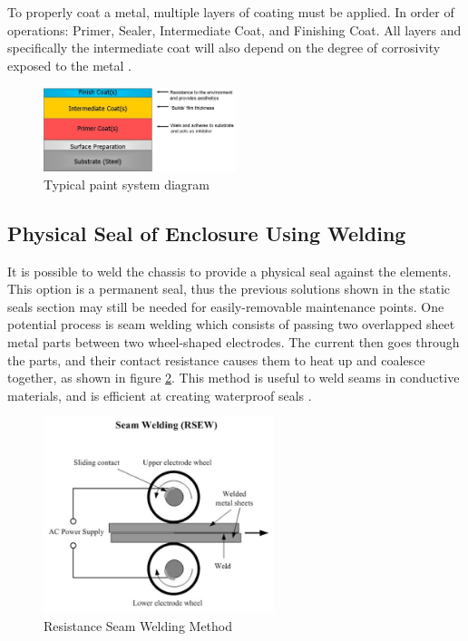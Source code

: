 To properly coat a metal, multiple layers of coating must be applied. In order of operations: Primer, Sealer, Intermediate Coat, and Finishing Coat. All layers and specifically the intermediate coat will also depend on the degree of corrosivity exposed to the metal \cite{noauthor_anti_nodate}.

\begin{figure}[H]
    \centering
    \includegraphics[width=0.5\textwidth]{Sections/LiteratureReview/img/coat_paint.jpg}
    \caption{Typical paint system diagram \cite{noauthor_paint_nodate}}
    \label{fig:paint}
\end{figure}


\subsection{Physical Seal of Enclosure Using Welding} \label{app:sealing}

It is possible to weld the chassis to provide a physical seal against the elements. This option is a permanent seal, thus the previous solutions shown in the static seals section may still be needed for easily-removable maintenance points. One potential process is seam welding which consists of passing two overlapped sheet metal parts between two wheel-shaped electrodes. The current then goes through the parts, and their contact resistance causes them to heat up and coalesce together, as shown in figure \ref{fig:welding_RSEW}. This method is useful to weld seams in conductive materials, and is efficient at creating waterproof seals \cite{weman_welding_2012}. 

\begin{figure}[H]
    \centering
    \includegraphics[width=0.6\textwidth]{Sections/LiteratureReview/img/seals/welding_RSEW.JPG}
    \caption{Resistance Seam Welding Method \cite{alawi_modal_2017}}
    \label{fig:welding_RSEW}
\end{figure}

